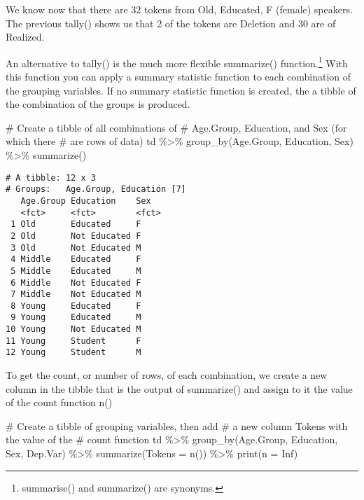 \documentclass[
  12pt,
  letterpaper]{article}
\newenvironment{Shaded}{\begin{snugshade}}{\end{snugshade}}
\newcommand{\AttributeTok}[1]{\textcolor[rgb]{0.40,0.45,0.13}{#1}}
\newcommand{\CommentTok}[1]{\textcolor[rgb]{0.37,0.37,0.37}{#1}}
\newcommand{\ConstantTok}[1]{\textcolor[rgb]{0.56,0.35,0.01}{#1}}
\newcommand{\FunctionTok}[1]{\textcolor[rgb]{0.28,0.35,0.67}{#1}}
\newcommand{\NormalTok}[1]{\textcolor[rgb]{0.00,0.23,0.31}{#1}}
\newcommand{\SpecialCharTok}[1]{\textcolor[rgb]{0.37,0.37,0.37}{#1}}
\renewcommand\texttt[1]{{\ttfamily\color{BrickRed}#1}}
\begin{document}
We know now that there are 32 tokens from \texttt{Old},
\texttt{Educated}, \texttt{F} (female) speakers. The previous
\texttt{tally()} shows us that 2 of the tokens are \texttt{Deletion} and
30 are of \texttt{Realized}.

An alternative to \texttt{tally()} is the much more flexible
\texttt{summarize()} function.\footnote{\texttt{summarise()} and
  \texttt{summarize()} are synonyms.} With this function you can apply a
summary statistic function to each combination of the grouping
variables. If no summary statistic function is created, the a tibble of
the combination of the groups is produced.

\begin{Shaded}
\begin{Highlighting}[]
\CommentTok{\# Create a tibble of all combinations of}
\CommentTok{\# Age.Group, Education, and Sex (for which there}
\CommentTok{\# are rows of data)}
\NormalTok{td }\SpecialCharTok{\%\textgreater{}\%}
    \FunctionTok{group\_by}\NormalTok{(Age.Group, Education, Sex) }\SpecialCharTok{\%\textgreater{}\%}
    \FunctionTok{summarize}\NormalTok{()}
\end{Highlighting}
\end{Shaded}

\begin{verbatim}
# A tibble: 12 x 3
# Groups:   Age.Group, Education [7]
   Age.Group Education    Sex  
   <fct>     <fct>        <fct>
 1 Old       Educated     F    
 2 Old       Not Educated F    
 3 Old       Not Educated M    
 4 Middle    Educated     F    
 5 Middle    Educated     M    
 6 Middle    Not Educated F    
 7 Middle    Not Educated M    
 8 Young     Educated     F    
 9 Young     Educated     M    
10 Young     Not Educated M    
11 Young     Student      F    
12 Young     Student      M    
\end{verbatim}

To get the count, or number of rows, of each combination, we create a
new column in the tibble that is the output of \texttt{summarize()} and
assign to it the value of the count function \texttt{n()}

\begin{Shaded}
\begin{Highlighting}[]
\CommentTok{\# Create a tibble of grouping variables, then add}
\CommentTok{\# a new column \textquotesingle{}Tokens\textquotesingle{} with the value of the}
\CommentTok{\# count function}
\NormalTok{td }\SpecialCharTok{\%\textgreater{}\%}
    \FunctionTok{group\_by}\NormalTok{(Age.Group, Education, Sex, Dep.Var) }\SpecialCharTok{\%\textgreater{}\%}
    \FunctionTok{summarize}\NormalTok{(}\AttributeTok{Tokens =} \FunctionTok{n}\NormalTok{()) }\SpecialCharTok{\%\textgreater{}\%}
    \FunctionTok{print}\NormalTok{(}\AttributeTok{n =} \ConstantTok{Inf}\NormalTok{)}
\end{Highlighting}
\end{Shaded}
\end{document}
